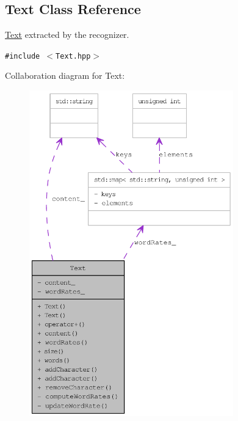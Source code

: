 \hypertarget{class_text}{
\subsection{Text Class Reference}
\label{class_text}
}
\hyperlink{class_text}{Text} extracted by the recognizer.  


{\tt \#include $<$Text.hpp$>$}

Collaboration diagram for Text:\nopagebreak
\begin{figure}[H]
\begin{center}
\leavevmode
\includegraphics[height=400pt]{class_text__coll__graph}
\end{center}
\end{figure}
